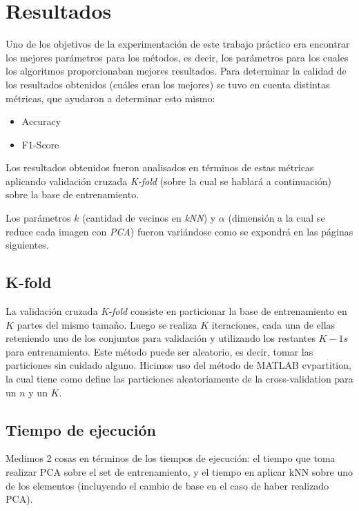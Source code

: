 \section{Resultados}

Uno de los objetivos de la experimentación de este trabajo práctico era encontrar los mejores parámetros para los métodos, es decir, los parámetros para los cuales los algoritmos proporcionaban mejores resultados. Para determinar la calidad de los resultados obtenidos (cuáles eran los mejores) se tuvo en cuenta distintas métricas, que ayudaron a determinar esto mismo:

\begin{itemize}
\item Accuracy
\item F1-Score
\end{itemize}

Los resultados obtenidos fueron analisados en términos de estas métricas aplicando validación cruzada \textit{K-fold} (sobre la cual se hablará a continuación) sobre la base de entrenamiento.

Los parámetros $k$ (cantidad de vecinos en \textit{kNN}) y $\alpha$ (dimensión a la cual se reduce cada imagen con \textit{PCA}) fueron variándose como se expondrá en las páginas siguientes.

\subsection{K-fold}

La validación cruzada \textit{K-fold} consiste en particionar la base de entrenamiento en $K$ partes del mismo tamaño. Luego se realiza $K$ iteraciones, cada una de ellas reteniendo uno de los conjuntos para validación y utilizando los restantes $K - 1s$ para entrenamiento. Este método puede ser aleatorio, es decir, tomar las particiones sin cuidado alguno. Hicimos uso del método de MATLAB cvpartition, la cual tiene como define las particiones aleatoriamente de la cross-validation para un $n$ y un $K$.

\subsection{Tiempo de ejecución}

Medimos 2 cosas en términos de los tiempos de ejecución: el tiempo que toma realizar PCA sobre el set de entrenamiento, y el tiempo en aplicar kNN sobre uno de los elementos (incluyendo el cambio de base en el caso de haber realizado PCA).

